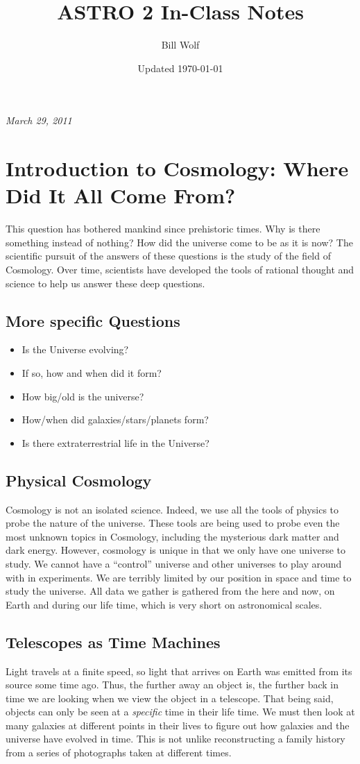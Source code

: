 \documentclass{article}
\title{ASTRO 2 In-Class Notes}
\author{Bill Wolf}
\date{Updated \today}
\begin{document}
\maketitle
\newpage{}
\tableofcontents
\newpage{}
		\textit{March 29, 2011}	
	\section{Introduction to Cosmology: Where Did It All Come From?}
	This question has bothered mankind since prehistoric times. Why is there something instead of nothing? How did the universe come to be as it is now? The scientific pursuit of the answers of these questions is the study of the field of Cosmology. Over time, scientists have developed the tools of rational thought and science to help us answer these deep questions.
	\subsection{More specific Questions}
	\begin{itemize}
		\item Is the Universe evolving?
		\item If so, how and when did it form?
		\item How big/old is the universe?
		\item How/when did galaxies/stars/planets form?
		\item Is there extraterrestrial life in the Universe?
	\end{itemize}
	\subsection{Physical Cosmology}
	Cosmology is not an isolated science. Indeed, we use all the tools of physics to probe the nature of the universe. These tools are being used to probe even the most unknown topics in Cosmology, including the mysterious dark matter and dark energy. However, cosmology is unique in that we only have one universe to study. We cannot have a ``control'' universe and other universes to play around with in experiments. We are terribly limited by our position in space and time to study the universe. All data we gather is gathered from the here and now, on Earth and during our life time, which is very short on astronomical scales.
	\subsection{Telescopes as Time Machines}
	Light travels at a finite speed, so light that arrives on Earth was emitted from its source some time ago. Thus, the further away an object is, the further back in time we are looking when we view the object in a telescope. That being said, objects can only be seen at a \emph{specific} time in their life time. We must then look at many galaxies at different points in their lives to figure out how galaxies and the universe have evolved in time. This is not unlike reconstructing a family history from a series of photographs taken at different times.\\
	
\end{document}
